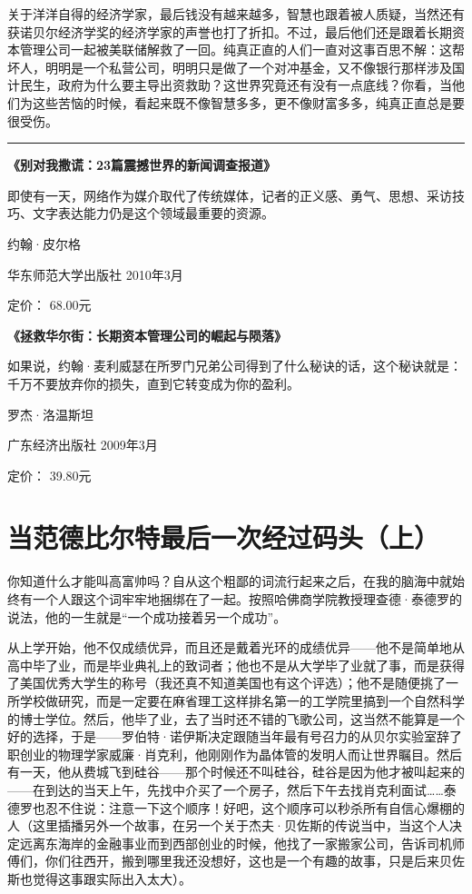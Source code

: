 关于洋洋自得的经济学家，最后钱没有越来越多，智慧也跟着被人质疑，当然还有获诺贝尔经济学奖的经济学家的声誉也打了折扣。不过，最后他们还是跟着长期资本管理公司一起被美联储解救了一回。纯真正直的人们一直对这事百思不解：这帮坏人，明明是一个私营公司，明明只是做了一个对冲基金，又不像银行那样涉及国计民生，政府为什么要主导出资救助？这世界究竟还有没有一点底线？你看，当他们为这些苦恼的时候，看起来既不像智慧多多，更不像财富多多，纯真正直总是要很受伤。

\begin{center}\rule{3in}{0.4pt}\end{center}

\textbf{《别对我撒谎：23篇震撼世界的新闻调查报道》}

即使有一天，网络作为媒介取代了传统媒体，记者的正义感、勇气、思想、采访技巧、文字表达能力仍是这个领域最重要的资源。

约翰·皮尔格

华东师范大学出版社 2010年3月

定价： 68.00元

\textbf{《拯救华尔街：长期资本管理公司的崛起与陨落》}

如果说，约翰·麦利威瑟在所罗门兄弟公司得到了什么秘诀的话，这个秘诀就是：千万不要放弃你的损失，直到它转变成为你的盈利。

罗杰·洛温斯坦

广东经济出版社 2009年3月

定价： 39.80元

\section{当范德比尔特最后一次经过码头（上）}

你知道什么才能叫高富帅吗？自从这个粗鄙的词流行起来之后，在我的脑海中就始终有一个人跟这个词牢牢地捆绑在了一起。按照哈佛商学院教授理查德·泰德罗的说法，他的一生就是``一个成功接着另一个成功''。

从上学开始，他不仅成绩优异，而且还是戴着光环的成绩优异------他不是简单地从高中毕了业，而是毕业典礼上的致词者；他也不是从大学毕了业就了事，而是获得了美国优秀大学生的称号（我还真不知道美国也有这个评选）；他不是随便挑了一所学校做研究，而是一定要在麻省理工这样排名第一的工学院里搞到一个自然科学的博士学位。然后，他毕了业，去了当时还不错的飞歌公司，这当然不能算是一个好的选择，于是------罗伯特·诺伊斯决定跟随当年最有号召力的从贝尔实验室辞了职创业的物理学家威廉·肖克利，他刚刚作为晶体管的发明人而让世界瞩目。然后有一天，他从费城飞到硅谷------那个时候还不叫硅谷，硅谷是因为他才被叫起来的------在到达的当天上午，先找中介买了一个房子，然后下午去找肖克利面试\ldots{}\ldots{}泰德罗也忍不住说：注意一下这个顺序！好吧，这个顺序可以秒杀所有自信心爆棚的人（这里插播另外一个故事，在另一个关于杰夫·贝佐斯的传说当中，当这个人决定远离东海岸的金融事业而到西部创业的时候，他找了一家搬家公司，告诉司机师傅们，你们往西开，搬到哪里我还没想好，这也是一个有趣的故事，只是后来贝佐斯也觉得这事跟实际出入太大）。

